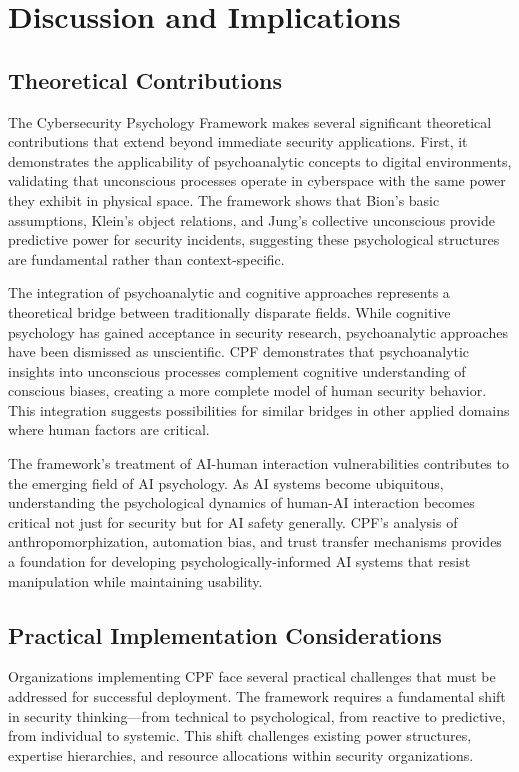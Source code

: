 \documentclass[manuscript,screen,review]{acmart}
\begin{document}
\section{Discussion and Implications}

\subsection{Theoretical Contributions}

The Cybersecurity Psychology Framework makes several significant theoretical contributions that extend beyond immediate security applications. First, it demonstrates the applicability of psychoanalytic concepts to digital environments, validating that unconscious processes operate in cyberspace with the same power they exhibit in physical space. The framework shows that Bion's basic assumptions, Klein's object relations, and Jung's collective unconscious provide predictive power for security incidents, suggesting these psychological structures are fundamental rather than context-specific.

The integration of psychoanalytic and cognitive approaches represents a theoretical bridge between traditionally disparate fields. While cognitive psychology has gained acceptance in security research, psychoanalytic approaches have been dismissed as unscientific. CPF demonstrates that psychoanalytic insights into unconscious processes complement cognitive understanding of conscious biases, creating a more complete model of human security behavior. This integration suggests possibilities for similar bridges in other applied domains where human factors are critical.

The framework's treatment of AI-human interaction vulnerabilities contributes to the emerging field of AI psychology. As AI systems become ubiquitous, understanding the psychological dynamics of human-AI interaction becomes critical not just for security but for AI safety generally. CPF's analysis of anthropomorphization, automation bias, and trust transfer mechanisms provides a foundation for developing psychologically-informed AI systems that resist manipulation while maintaining usability.

\subsection{Practical Implementation Considerations}

Organizations implementing CPF face several practical challenges that must be addressed for successful deployment. The framework requires a fundamental shift in security thinking—from technical to psychological, from reactive to predictive, from individual to systemic. This shift challenges existing power structures, expertise hierarchies, and resource allocations within security organizations.
\end{document}
